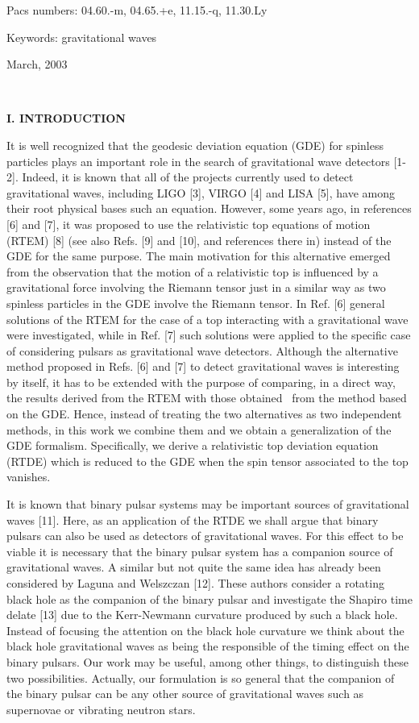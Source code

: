 \documentclass[a4paper,12pt]{article}
\begin{document}
Pacs numbers: 04.60.-m, 04.65.+e, 11.15.-q, 11.30.Ly

Keywords: gravitational waves

March, 2003

\newpage\ 

\noindent \textbf{I. INTRODUCTION}

\bigskip

It is well recognized that the geodesic deviation equation (GDE) for
spinless particles plays an important role in the search of gravitational
wave detectors [1-2]. Indeed, it is known that all of the projects currently
used to detect gravitational waves, including LIGO [3], VIRGO [4] and LISA
[5], have among their root physical bases such an equation. However, some
years ago, in references [6] and [7], it was proposed to use the
relativistic top equations of motion (RTEM) [8] (see also Refs. [9] and
[10], and references there in) instead of the GDE for the same purpose. The
main motivation for this alternative emerged from the observation that the
motion of a relativistic top is influenced by a gravitational force
involving the Riemann tensor just in a similar way as two spinless particles
in the GDE involve the Riemann tensor. In Ref. [6] general solutions of the
RTEM for the case of a top interacting with a gravitational wave were
investigated, while in Ref. [7] such solutions were applied to the specific
case of considering pulsars as gravitational wave detectors. Although the
alternative method proposed in Refs. [6] and [7] to detect gravitational
waves is interesting by itself, it has to be extended with the purpose of
comparing, in a direct way, the results derived from the RTEM with those
obtained \ from the method based on the GDE. Hence, instead of treating the
two alternatives as two independent methods, in this work we combine them
and we obtain a generalization of the GDE formalism. Specifically, we derive
a relativistic top deviation equation (RTDE) which is reduced to the GDE
when the spin tensor associated to the top vanishes.

It is known that binary pulsar systems may be important sources of
gravitational waves [11]. Here, as an application of the RTDE we shall argue
that binary pulsars can also be used as detectors of gravitational waves.
For this effect to be viable it is necessary that the binary pulsar system
has a companion source of gravitational waves. A similar but not quite the
same idea has already been considered by Laguna and Welszczan [12]. These
authors consider a rotating black hole as the companion of the binary pulsar
and investigate the Shapiro time delate [13] due to the Kerr-Newmann
curvature produced by such a black hole. Instead of focusing the attention
on the black hole curvature we think about the black hole gravitational
waves as being the responsible of the timing effect on the binary pulsars.
Our work may be useful, among other things, to distinguish these two
possibilities. Actually, our formulation is so general that the companion of
the binary pulsar can be any other source of gravitational waves such as
supernovae or vibrating neutron stars.
\end{document}
